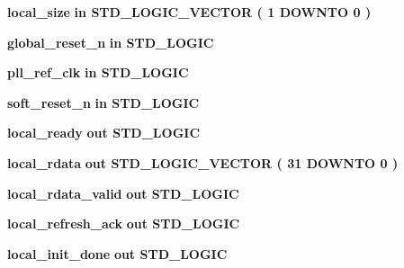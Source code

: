 \begin{DoxyCompactItemize}
\item 
{\bf local\+\_\+size}  {\bfseries {\bfseries \textcolor{keywordflow}{in}\textcolor{vhdlchar}{ }}} {\bfseries \textcolor{comment}{S\+T\+D\+\_\+\+L\+O\+G\+I\+C\+\_\+\+V\+E\+C\+T\+OR}\textcolor{vhdlchar}{ }\textcolor{vhdlchar}{(}\textcolor{vhdlchar}{ }\textcolor{vhdlchar}{ } \textcolor{vhdldigit}{1} \textcolor{vhdlchar}{ }\textcolor{keywordflow}{D\+O\+W\+N\+TO}\textcolor{vhdlchar}{ }\textcolor{vhdlchar}{ } \textcolor{vhdldigit}{0} \textcolor{vhdlchar}{ }\textcolor{vhdlchar}{)}\textcolor{vhdlchar}{ }} 
\item 
{\bf global\+\_\+reset\+\_\+n}  {\bfseries {\bfseries \textcolor{keywordflow}{in}\textcolor{vhdlchar}{ }}} {\bfseries \textcolor{comment}{S\+T\+D\+\_\+\+L\+O\+G\+IC}\textcolor{vhdlchar}{ }} 
\item 
{\bf pll\+\_\+ref\+\_\+clk}  {\bfseries {\bfseries \textcolor{keywordflow}{in}\textcolor{vhdlchar}{ }}} {\bfseries \textcolor{comment}{S\+T\+D\+\_\+\+L\+O\+G\+IC}\textcolor{vhdlchar}{ }} 
\item 
{\bf soft\+\_\+reset\+\_\+n}  {\bfseries {\bfseries \textcolor{keywordflow}{in}\textcolor{vhdlchar}{ }}} {\bfseries \textcolor{comment}{S\+T\+D\+\_\+\+L\+O\+G\+IC}\textcolor{vhdlchar}{ }} 
\item 
{\bf local\+\_\+ready}  {\bfseries {\bfseries \textcolor{keywordflow}{out}\textcolor{vhdlchar}{ }}} {\bfseries \textcolor{comment}{S\+T\+D\+\_\+\+L\+O\+G\+IC}\textcolor{vhdlchar}{ }} 
\item 
{\bf local\+\_\+rdata}  {\bfseries {\bfseries \textcolor{keywordflow}{out}\textcolor{vhdlchar}{ }}} {\bfseries \textcolor{comment}{S\+T\+D\+\_\+\+L\+O\+G\+I\+C\+\_\+\+V\+E\+C\+T\+OR}\textcolor{vhdlchar}{ }\textcolor{vhdlchar}{(}\textcolor{vhdlchar}{ }\textcolor{vhdlchar}{ } \textcolor{vhdldigit}{31} \textcolor{vhdlchar}{ }\textcolor{keywordflow}{D\+O\+W\+N\+TO}\textcolor{vhdlchar}{ }\textcolor{vhdlchar}{ } \textcolor{vhdldigit}{0} \textcolor{vhdlchar}{ }\textcolor{vhdlchar}{)}\textcolor{vhdlchar}{ }} 
\item 
{\bf local\+\_\+rdata\+\_\+valid}  {\bfseries {\bfseries \textcolor{keywordflow}{out}\textcolor{vhdlchar}{ }}} {\bfseries \textcolor{comment}{S\+T\+D\+\_\+\+L\+O\+G\+IC}\textcolor{vhdlchar}{ }} 
\item 
{\bf local\+\_\+refresh\+\_\+ack}  {\bfseries {\bfseries \textcolor{keywordflow}{out}\textcolor{vhdlchar}{ }}} {\bfseries \textcolor{comment}{S\+T\+D\+\_\+\+L\+O\+G\+IC}\textcolor{vhdlchar}{ }} 
\item 
{\bf local\+\_\+init\+\_\+done}  {\bfseries {\bfseries \textcolor{keywordflow}{out}\textcolor{vhdlchar}{ }}} {\bfseries \textcolor{comment}{S\+T\+D\+\_\+\+L\+O\+G\+IC}\textcolor{vhdlchar}{ }} 

\end{DoxyCompactItemize}
